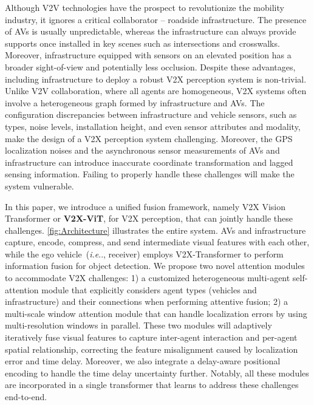 \documentclass[runningheads]{llncs}
\makeatletter
\DeclareRobustCommand\onedot{\futurelet\@let@token\@onedot}
\def\@onedot{\ifx\@let@token.\else.\null\fi\xspace}
\def\ie{\emph{i.e}\onedot} \def\Ie{\emph{I.e}\onedot}
\makeatother
\begin{document}
Although V2V technologies have the prospect to revolutionize the mobility industry, it ignores a critical collaborator -- roadside infrastructure. The presence of AVs is usually unpredictable, whereas the infrastructure can always provide supports once installed in key scenes such as intersections and crosswalks. Moreover, infrastructure equipped with sensors on an elevated position has a broader sight-of-view and potentially less occlusion.
Despite these advantages, including infrastructure to deploy a robust V2X perception system is non-trivial. Unlike V2V collaboration, where all agents are homogeneous, V2X systems often involve a heterogeneous graph formed by infrastructure and AVs. The configuration discrepancies between infrastructure and vehicle sensors, such as types, noise levels, installation height, and even sensor attributes and modality, make the design of a V2X perception system challenging.
Moreover, the GPS localization noises and the asynchronous sensor measurements of AVs and infrastructure can introduce inaccurate coordinate transformation and lagged sensing information.
Failing to properly handle these challenges will make the system vulnerable.


In this paper, we introduce a unified fusion framework, namely V2X Vision Transformer or {\textbf{V2X-ViT}}, for V2X perception, that can jointly handle these challenges. \cref{fig:Architecture} illustrates the entire system. AVs and infrastructure capture, encode, compress, and send intermediate visual features with each other, while the ego vehicle~(\ie, receiver) employs V2X-Transformer to perform information fusion for object detection. We propose two novel attention modules to accommodate V2X challenges: 1) a customized heterogeneous multi-agent self-attention module that explicitly considers agent types (vehicles and infrastructure) and their connections when performing attentive fusion; 2) a multi-scale window attention module that can handle localization errors by using multi-resolution windows in parallel. These two modules will adaptively iteratively fuse visual features to capture inter-agent interaction and per-agent spatial relationship, correcting the feature misalignment caused by localization error and time delay.  Moreover, we also integrate a delay-aware positional encoding to handle the time delay uncertainty further. Notably, all these modules are incorporated in a single transformer that learns to address these challenges end-to-end.
\end{document}
